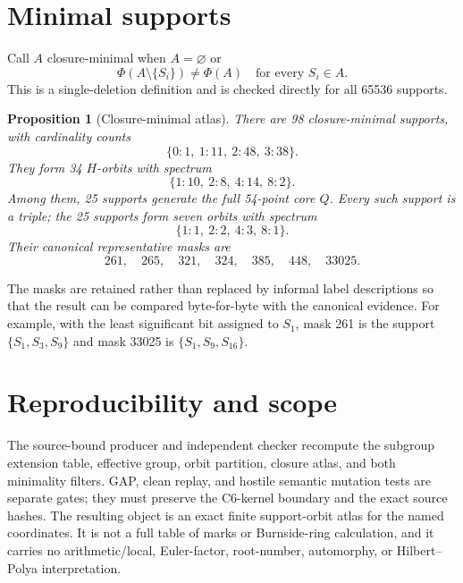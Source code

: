 \documentclass[10pt]{article}
\newtheorem{proposition}{Proposition}
\begin{document}
\section{Minimal supports}
Call $A$ closure-minimal when $A=\varnothing$ or
\[
\Phi(A\setminus\{S_i\})\neq\Phi(A)
\quad\text{for every }S_i\in A.
\]
This is a single-deletion definition and is checked directly for all 65536
supports.

\begin{proposition}[Closure-minimal atlas]
There are 98 closure-minimal supports, with cardinality counts
\[
\{0:1,\ 1:11,\ 2:48,\ 3:38\}.
\]
They form 34 $H$-orbits with spectrum
\[
\{1:10,\ 2:8,\ 4:14,\ 8:2\}.
\]
Among them, 25 supports generate the full 54-point core $Q$.  Every such
support is a triple; the 25 supports form seven orbits with spectrum
\[
\{1:1,\ 2:2,\ 4:3,\ 8:1\}.
\]
Their canonical representative masks are
\[
261,\quad265,\quad321,\quad324,\quad385,\quad448,\quad33025.
\]
\end{proposition}

The masks are retained rather than replaced by informal label descriptions so
that the result can be compared byte-for-byte with the canonical evidence.
For example, with the least significant bit assigned to $S_1$, mask 261 is
the support $\{S_1,S_3,S_9\}$ and mask 33025 is $\{S_1,S_9,S_{16}\}$.

\section{Reproducibility and scope}
The source-bound producer and independent checker recompute the subgroup
extension table, effective group, orbit partition, closure atlas, and both
minimality filters.  GAP, clean replay, and hostile semantic mutation tests
are separate gates; they must preserve the C6-kernel boundary and the exact
source hashes.  The resulting object is an exact finite support-orbit atlas
for the named coordinates.  It is not a full table of marks or Burnside-ring
calculation, and it carries no arithmetic/local, Euler-factor, root-number,
automorphy, or Hilbert--Polya interpretation.
\end{document}
